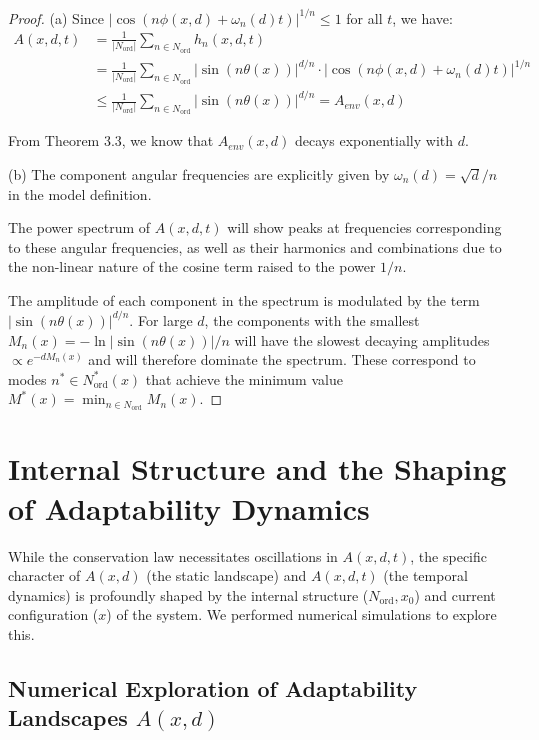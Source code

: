 \documentclass[11pt,a4paper]{article}
\begin{document}
\begin{proof}
(a) Since $|\cos(n\phi(x,d) + \omega_n(d)t)|^{1/n} \leq 1$ for all $t$, we have:
\begin{align}
A(x,d,t) &= \frac{1}{|N_{\text{ord}}|} \sum_{n \in N_{\text{ord}}} h_n(x,d,t) \\
&= \frac{1}{|N_{\text{ord}}|} \sum_{n \in N_{\text{ord}}} |\sin(n\theta(x))|^{d/n} \cdot |\cos(n\phi(x,d) + \omega_n(d)t)|^{1/n} \\
&\leq \frac{1}{|N_{\text{ord}}|} \sum_{n \in N_{\text{ord}}} |\sin(n\theta(x))|^{d/n} = A_{env}(x,d)
\end{align}

From Theorem 3.3, we know that $A_{env}(x,d)$ decays exponentially with $d$.

(b) The component angular frequencies are explicitly given by $\omega_n(d) = \sqrt{d}/n$ in the model definition.

The power spectrum of $A(x,d,t)$ will show peaks at frequencies corresponding to these angular frequencies, as well as their harmonics and combinations due to the non-linear nature of the cosine term raised to the power $1/n$.

The amplitude of each component in the spectrum is modulated by the term $|\sin(n\theta(x))|^{d/n}$. For large $d$, the components with the smallest $M_n(x) = -\ln|\sin(n\theta(x))|/n$ will have the slowest decaying amplitudes $\propto e^{-d M_n(x)}$ and will therefore dominate the spectrum. These correspond to modes $n^* \in N_{\text{ord}}^*(x)$ that achieve the minimum value $M^*(x) = \min_{n \in N_{\text{ord}}} M_n(x)$.
\end{proof}

\section{Internal Structure and the Shaping of Adaptability Dynamics}

While the conservation law necessitates oscillations in $A(x,d,t)$, the specific character of $A(x,d)$ (the static landscape) and $A(x,d,t)$ (the temporal dynamics) is profoundly shaped by the internal structure ($N_{\text{ord}}, x_0$) and current configuration ($x$) of the system. We performed numerical simulations to explore this.

\subsection[Numerical Exploration of Adaptability Landscapes]{Numerical Exploration of Adaptability Landscapes $A(x,d)$}
\end{document}
